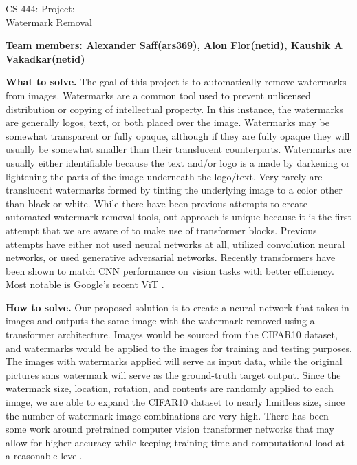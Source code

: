 \documentclass[11pt]{article}
\begin{document}
\begin{center}
\large{CS 444: Project:\\Watermark Removal}\\
\end{center}
\vspace{5mm}

\textbf{Team members: Alexander Saff(ars369), Alon Flor(netid), Kaushik A Vakadkar(netid)}




\begin{sloppypar}
\textbf{What to solve.}
The goal of this project is to automatically remove watermarks from images. Watermarks are a common tool used to prevent unlicensed distribution or copying of intellectual property. In this instance, the watermarks are generally logos, text, or both placed over the image. Watermarks may be somewhat transparent or fully opaque, although if they are fully opaque they will usually be somewhat smaller than their translucent counterparts. Watermarks are usually either identifiable because the text and/or logo is a made by darkening or lightening the parts of the image underneath the logo/text. Very rarely are translucent watermarks formed by tinting the underlying image to a color other than black or white. While there have been previous attempts to create automated watermark removal tools, out approach is unique because it is the first attempt that we are aware of to make use of transformer blocks. \cite{transformer} Previous attempts have either not used neural networks at all, utilized convolution neural networks, or used generative adversarial networks. Recently transformers have been shown to match CNN performance on vision tasks with better efficiency. Most notable is Google's recent ViT \cite{dosovitskiy2020image}.
\end{sloppypar}

\begin{sloppypar}
\textbf{How to solve.} 
Our proposed solution is to create a neural network that takes in images and outputs the same image with the watermark removed using a transformer architecture. Images would be sourced from the CIFAR10 dataset, and watermarks would be applied to the images for training and testing purposes. The images with watermarks applied will serve as input data, while the original pictures sans watermark will serve as the ground-truth target output. Since the watermark size, location, rotation, and contents are randomly applied to each image, we are able to expand the CIFAR10 dataset to nearly limitless size, since the number of watermark-image combinations are very high. There has been some work around pretrained computer vision transformer networks that may allow for higher accuracy while keeping training time and computational load at a reasonable level. 
\end{sloppypar}
\end{document}
